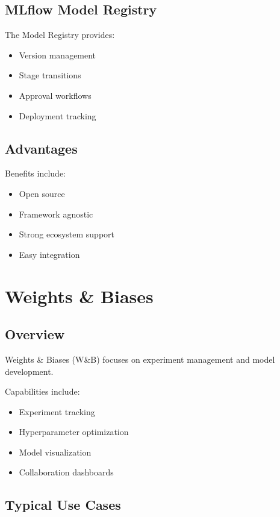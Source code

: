 \subsection{MLflow Model Registry}

The Model Registry provides:

\begin{itemize}
    \item Version management
    \item Stage transitions
    \item Approval workflows
    \item Deployment tracking
\end{itemize}

\subsection{Advantages}

Benefits include:

\begin{itemize}
    \item Open source
    \item Framework agnostic
    \item Strong ecosystem support
    \item Easy integration
\end{itemize}

\section{Weights \& Biases}

\subsection{Overview}

Weights \& Biases (W\&B) focuses on experiment management and model development.

Capabilities include:

\begin{itemize}
    \item Experiment tracking
    \item Hyperparameter optimization
    \item Model visualization
    \item Collaboration dashboards
\end{itemize}

\subsection{Typical Use Cases}

